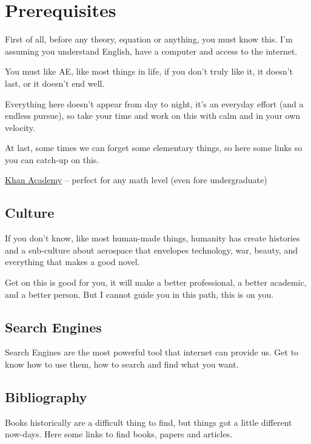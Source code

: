 
\chapter{Prerequisites}
First of all, before any theory, equation or anything,
you must know this.
I'm assuming you understand English, have a computer and access to the
internet.

You must like AE, like most things in life, if you
don't truly like it, it doesn't last, or it doesn't end well.

Everything here doesn't appear from day to night, it's an everyday
effort (and a endless pursue), so take your time and work on this
with calm and in your own velocity.

At last, some times we can forget some elementary things, so here
some links so you can catch-up on this.

\begin{description}
    \item{\href{https://www.khanacademy.org/}{Khan Academy} -- perfect for any math level (even fore undergraduate)}
\end{description}{}

\section{Culture}

If you don't know, like most human-made things, humanity
has create histories and a sub-culture about aerospace that envelopes
technology, war, beauty, and everything that makes a good novel.

Get on this is good for you, it will make a better professional,
a better academic, and a better person. But I cannot guide
you in this path, this is on you.

\section{Search Engines}
Search Engines are the most powerful tool that
internet can provide us. Get to know how to use them, how to search
and find what you want.


\section{Bibliography}
Books historically are a difficult thing to find,
but things got a little different now-days. Here some links
to find books, papers and articles.

